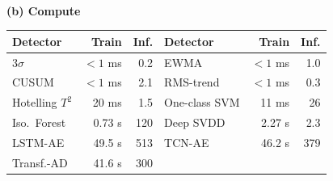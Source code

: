 \begin{table}[t]
\begin{center}
	\\[6pt]\textbf{(b) Compute}\\[2pt]
	\setlength{\tabcolsep}{3pt}
	\begin{tabular}{l r r | l r r}
		\hline \hline
		\textbf{Detector} & \textbf{Train} & \textbf{Inf.} & \textbf{Detector} & \textbf{Train} & \textbf{Inf.} \\
		\hline
		$3\sigma$ & $<1$ ms & 0.2 & EWMA & $<1$ ms & 1.0 \\
		CUSUM & $<1$ ms & 2.1 & RMS-trend & $<1$ ms & 0.3 \\
		Hotelling $T^2$ & 20 ms & 1.5 & One-class SVM & 11 ms & 26 \\
		Iso.\ Forest & 0.73 s & 120 & Deep SVDD & 2.27 s & 2.3 \\
		LSTM-AE & 49.5 s & 513 & TCN-AE & 46.2 s & 379 \\
		Transf.-AD & 41.6 s & 300 & & & \\
		\hline \hline
	\end{tabular}
	\end{center}
\end{table}
